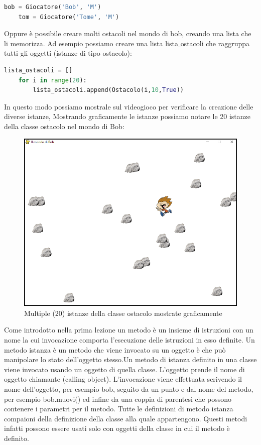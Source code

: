 \documentclass[12pt,a4paper]{article}
\begin{document}
\begin{lstlisting}[language=Python, caption=Due istanze della classe Giocatore]
    bob = Giocatore('Bob', 'M')
    tom = Giocatore('Tome', 'M')
\end{lstlisting}
Oppure è possibile creare molti ostacoli nel mondo di bob, creando una lista che li memorizza. Ad esempio possiamo creare una lista lista$\_$ostacoli che raggruppa tutti gli oggetti (istanze di tipo ostacolo):

\begin{lstlisting}[language=Python, caption=Multiple (20) istanze della classe ostacolo]
    lista_ostacoli = []
    for i in range(20):
        lista_ostacoli.append(Ostacolo(i,10,True))
\end{lstlisting}
In questo modo possiamo mostrale sul videogioco per verificare la creazione delle diverse istanze, 
Mostrando graficamente le istanze possiamo notare le 20 istanze della classe ostacolo nel mondo di Bob:

\begin{figure}[H]
\begin{center}
    \includegraphics[width=\textwidth,height=\textheight,keepaspectratio]{img/bob_multiple_istanze.PNG}
\end{center}
\caption{Multiple (20) istanze della classe ostacolo mostrate graficamente}
\end{figure}

Come introdotto nella prima lezione un metodo è un insieme di istruzioni con un nome la cui invocazione comporta l’esecuzione delle istruzioni in esso definite. Un metodo istanza è un metodo che viene invocato su un oggetto è che può manipolare lo stato dell’oggetto stesso.Un metodo di istanza definito in una classe viene invocato usando un oggetto di quella classe. L'oggetto prende il nome di oggetto chiamante (calling object). L’invocazione viene effettuata scrivendo il nome dell’oggetto, per esempio bob, seguito da un punto e dal nome del metodo, per esempio bob.muovi() ed infine da una coppia di parentesi che possono contenere i parametri per il metodo. Tutte le definizioni di metodo istanza compaioni della definizione della classe alla quale appartengono. Questi metodi infatti possono essere usati solo con oggetti della classe in cui il metodo è definito.  
\end{document}
